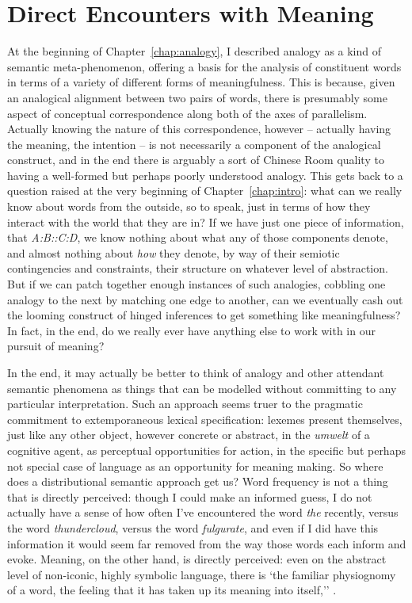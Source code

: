 \section{Direct Encounters with Meaning}
At the beginning of Chapter~\ref{chap:analogy}, I described analogy as a kind of semantic meta-phenomenon, offering a basis for the analysis of constituent words in terms of a variety of different forms of meaningfulness.  This is because, given an analogical alignment between two pairs of words, there is presumably some aspect of conceptual correspondence along both of the axes of parallelism.  Actually knowing the nature of this correspondence, however -- actually having the meaning, the intention -- is not necessarily a component of the analogical construct, and in the end there is arguably a sort of Chinese Room \citep{Searle1980} quality to having a well-formed but perhaps poorly understood analogy.  This gets back to a question raised at the very beginning of Chapter~\ref{chap:intro}: what can we really know about words from the outside, so to speak, just in terms of how they interact with the world that they are in?  If we have just one piece of information, that \emph{A:B::C:D}, we know nothing about what any of those components denote, and almost nothing about \emph{how} they denote, by way of their semiotic contingencies and constraints, their structure on whatever level of abstraction.  But if we can patch together enough instances of such analogies, cobbling one analogy to the next by matching one edge to another, can we eventually cash out the looming construct of hinged inferences to get something like meaningfulness?  In fact, in the end, do we really ever have anything else to work with in our pursuit of meaning?

In the end, it may actually be better to think of analogy and other attendant semantic phenomena as things that can be modelled without committing to any particular interpretation.  Such an approach seems truer to the pragmatic commitment to extemporaneous lexical specification: lexemes present themselves, just like any other object, however concrete or abstract, in the \emph{umwelt} of a cognitive agent, as perceptual opportunities for action, in the specific but perhaps not special case of language as an opportunity for meaning making.  So where does a distributional semantic approach get us?  Word frequency is not a thing that is directly perceived: though I could make an informed guess, I do not actually have a sense of how often I've encountered the word \emph{the} recently, versus the word \emph{thundercloud}, versus the word \emph{fulgurate}, and even if I did have this information it would seem far removed from the way those words each inform and evoke.  Meaning, on the other hand, is directly perceived: even on the abstract level of non-iconic, highly symbolic language, there is `the familiar physiognomy of a word, the feeling that it has taken up its meaning into itself,'' \citep[][p. 218]{Wittgenstein1953}.


